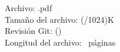 
\vspace{24pt}
\ttfamily
\noindent Archivo: \jobname.pdf \\
Tamaño del archivo: \the\numexpr(\filesize{\PICTFile}/1024)K \\
Revisión Git: \texttt{\commit}(\texttt{\branch})\\
Longitud del archivo: \the\numexpr\value{page}~páginas \\



